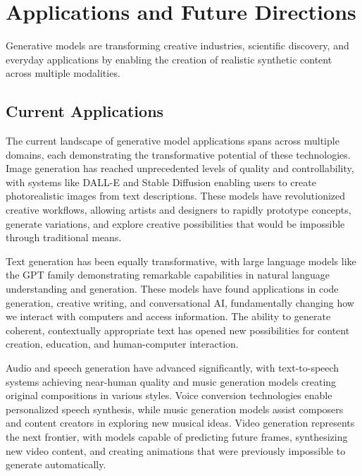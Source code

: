 
\section{Applications and Future Directions }
\label{sec:generative-applications}

Generative models are transforming creative industries, scientific discovery, and everyday applications by enabling the creation of realistic synthetic content across multiple modalities.

\subsection{Current Applications}

The current landscape of generative model applications spans across multiple domains, each demonstrating the transformative potential of these technologies. Image generation has reached unprecedented levels of quality and controllability, with systems like DALL-E and Stable Diffusion enabling users to create photorealistic images from text descriptions. These models have revolutionized creative workflows, allowing artists and designers to rapidly prototype concepts, generate variations, and explore creative possibilities that would be impossible through traditional means.

Text generation has been equally transformative, with large language models like the GPT family demonstrating remarkable capabilities in natural language understanding and generation. These models have found applications in code generation, creative writing, and conversational AI, fundamentally changing how we interact with computers and access information. The ability to generate coherent, contextually appropriate text has opened new possibilities for content creation, education, and human-computer interaction.

Audio and speech generation have advanced significantly, with text-to-speech systems achieving near-human quality and music generation models creating original compositions in various styles. Voice conversion technologies enable personalized speech synthesis, while music generation models assist composers and content creators in exploring new musical ideas. Video generation represents the next frontier, with models capable of predicting future frames, synthesizing new video content, and creating animations that were previously impossible to generate automatically.

